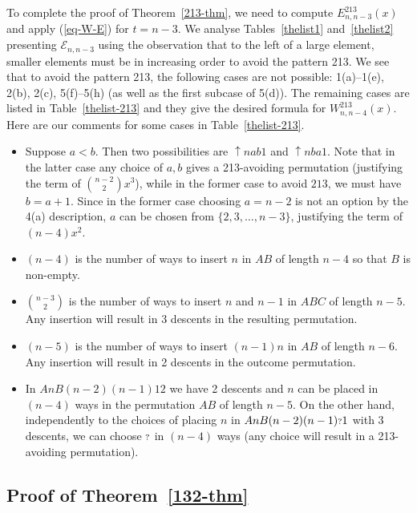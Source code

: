 \documentclass[11pt]{article}
\newcommand{\exactly}[2]{\ensuremath{\mathcal{E}_{#1,#2}}}
\newcommand{\q}{\mbox{\ensuremath{\scriptstyle{?}}}}
\newcommand{\+}{\mbox{\ensuremath{\scriptstyle{+}}}}
\begin{document}
To complete the proof of Theorem~\ref{213-thm}, we need to compute $E^{213}_{n,n-3}(x)$ and apply (\ref{eq-W-E}) for $t=n-3$. We analyse Tables~\ref{thelist1} and~\ref{thelist2} presenting $\exactly{n}{n-3}$ using the observation that to the left of a large element, smaller elements must be in increasing order to avoid the pattern 213. We see that to avoid the pattern 213, the following cases are not possible: 1(a)--1(e), 2(b), 2(c), 5(f)--5(h) (as well as the first subcase of 5(d)). The remaining cases are listed in Table~\ref{thelist-213} and they give the desired formula for $W^{213}_{n,n-4}(x)$. Here are our comments for some cases in Table~\ref{thelist-213}.
\begin{itemize}
	\item[4(a)]  Suppose $a<b$. Then two possibilities are $\uparrow nab1$ and $\uparrow nba1$. Note that in the latter case any choice of $a,b$ gives a 213-avoiding permutation (justifying the term of ${n-2\choose 2}x^3$), while in the former case to avoid $213$, we must have $b=a+1$. Since in the former case choosing $a=n-2$ is not an option by the 4(a) description, $a$ can be chosen from $\{2,3,\ldots, n-3\}$, justifying the term of $(n-4)x^2$.
	\item[5(a)]  $(n-4)$ is the number of ways to insert $n$ in $AB$ of length $n-4$ so that $B$ is non-empty.
	\item[5(c)]  ${n-3\choose 2}$ is the number of ways to insert $n$ and $n-1$ in $ABC$ of length $n-5$. Any insertion will result in 3 descents in the resulting permutation.
	\item[5(d)]  $(n-5)$ is the number of ways to insert $(n-1)n$ in $AB$ of length $n-6$. Any insertion  will  result in 2 descents in the outcome permutation.
	\item[5(e)]  In $AnB(n-2)(n-1)12$ we have 2 descents and $n$ can be placed in $(n-4)$ ways in the permutation $AB$ of length $n-5$. On the other hand, independently to the choices of placing $n$ in  $AnB(n-2)(n-1)\q1$ with 3 descents, we can choose $\q$ in $(n-4)$ ways ({any choice will result in a 213-avoiding permutation}).
\end{itemize}


\subsection{Proof of Theorem~\ref{132-thm}}
\end{document}
